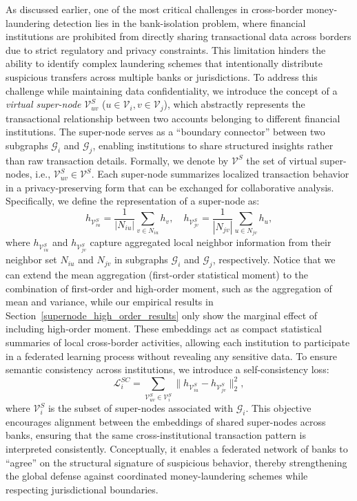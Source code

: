 As discussed earlier, one of the most critical challenges in cross-border money-laundering detection lies in the bank-isolation problem, where financial institutions are prohibited from directly sharing transactional data across borders due to strict regulatory and privacy constraints. This limitation hinders the ability to identify complex laundering schemes that intentionally distribute suspicious transfers across multiple banks or jurisdictions. To address this challenge while maintaining data confidentiality, we introduce the concept of a \textit{virtual super-node} $\mathcal{V}^S_{uv}$ ($u \in \mathcal{V}_i, v \in \mathcal{V}_j$), which abstractly represents the transactional relationship between two accounts belonging to different financial institutions. The super-node serves as a ``boundary connector'' between two subgraphs $\mathcal{G}_i$ and $\mathcal{G}_j$, enabling institutions to share structured insights rather than raw transaction details. Formally, we denote by $\mathcal{V}^S$ the set of virtual super-nodes, i.e., $\mathcal{V}^S_{uv} \in \mathcal{V}^S$. Each super-node summarizes localized transaction behavior in a privacy-preserving form that can be exchanged for collaborative analysis. 
Specifically, we define the representation of a super-node as: 
\begin{equation}
    h_{\mathcal{V}^S_{iu}} = \frac{1}{|N_{iu}|}\sum_{v \in N_{iu}} h_v, \quad
    h_{\mathcal{V}^S_{jv}} = \frac{1}{|N_{jv}|}\sum_{u \in N_{jv}} h_u,
\end{equation}
where $h_{\mathcal{V}^S_{iu}}$ and $h_{\mathcal{V}^S_{jv}}$ capture aggregated local neighbor information from their neighbor set $N_{iu}$ and $N_{jv}$ in subgraphs $\mathcal{G}_i$ and $\mathcal{G}_j$, respectively. Notice that we can extend the mean aggregation (first-order statistical moment) to the combination of first-order and high-order moment, such as the aggregation of mean and variance, while our empirical results in Section~\ref{supernode_high_order_results} only show the marginal effect of including high-order moment. These embeddings act as compact statistical summaries of local cross-border activities, allowing each institution to participate in a federated learning process without revealing any sensitive data. To ensure semantic consistency across institutions, we introduce a self-consistency loss:
\begin{equation}
    \mathcal{L}_i^{SC} = \sum_{\mathcal{V}^S_{uv} \in \mathcal{V}^S_i} \| h_{\mathcal{V}^S_{iu}} - h_{\mathcal{V}^S_{jv}} \|_2^2,
\end{equation}
where $\mathcal{V}^S_i$ is the subset of super-nodes associated with $\mathcal{G}_i$. This objective encourages alignment between the embeddings of shared super-nodes across banks, ensuring that the same cross-institutional transaction pattern is interpreted consistently. Conceptually, it enables a federated network of banks to ``agree'' on the structural signature of suspicious behavior, thereby strengthening the global defense against coordinated money-laundering schemes while respecting jurisdictional boundaries.


